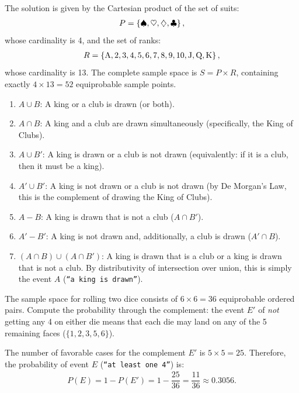 \begin{solproblema}[prob:de3947a]
	The solution is given by the Cartesian product of the set of suits:
	\begin{align}
		P = \left\{ \spadesuit, \heartsuit, \diamondsuit, \clubsuit \right\},
	\end{align}
	whose cardinality is 4, and the set of ranks:
	\begin{align}
		R = \left\{ \text{A}, 2, 3, 4, 5, 6, 7, 8, 9, 10, \text{J}, \text{Q}, \text{K} \right\},
	\end{align}
	whose cardinality is 13. The complete sample space is $S = P \times R$, containing exactly $4 \times 13 = 52$ equiprobable sample points.
\end{solproblema}

\begin{solproblema}
	\begin{enumerate}
		\item $A \cup B$: A king or a club is drawn (or both).
		\item $A \cap B$: A king and a club are drawn simultaneously (specifically, the King of Clubs).
		\item $A \cup B'$: A king is drawn or a club is not drawn (equivalently: if it is a club, then it must be a king).
		\item $A' \cup B'$: A king is not drawn or a club is not drawn (by De Morgan's Law, this is the complement of drawing the King of Clubs).
		\item $A - B$: A king is drawn that is not a club ($A \cap B'$).
		\item $A'-B'$: A king is not drawn and, additionally, a club is drawn ($A' \cap B$).
		\item $(A \cap B) \cup (A \cap B')$: A king is drawn that is a club or a king is drawn that is not a club. By distributivity of intersection over union, this is simply the event $A$ (\texttt{``a king is drawn''}).
	\end{enumerate}
\end{solproblema}

\begin{solproblema}[prob:69a20ec]
	The sample space for rolling two dice consists of $6 \times 6 = 36$ equiprobable ordered pairs. Compute the probability through the complement: the event $E'$ of \emph{not} getting any 4 on either die means that each die may land on any of the 5 remaining faces ($\{1,2,3,5,6\}$).

	The number of favorable cases for the complement $E'$ is $5 \times 5 = 25$. Therefore, the probability of event $E$ (\texttt{``at least one 4''}) is:
	\begin{align}
		P(E) = 1 - P(E') = 1 - \dfrac{25}{36} = \dfrac{11}{36} \approx 0.3056.
	\end{align}
\end{solproblema}

